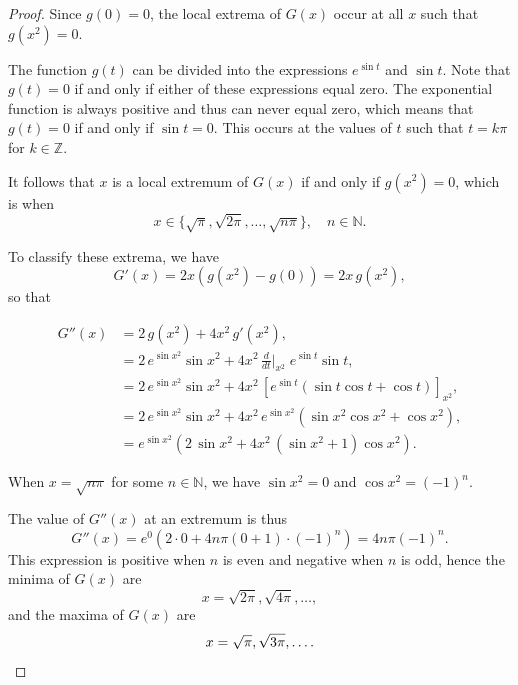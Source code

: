 \begin{enumerate}
\begin{enumerate}
\begin{proof}
                    Since $g(0) = 0$, the local extrema of $G(x)$ occur at all $x$ such that $g(x^2) = 0$.

                    The function $g(t)$ can be divided into the expressions $e^{\sin t}$ and $\sin t$.
                    Note that $g(t) = 0$ if and only if either of these expressions equal zero.
                    The exponential function is always positive and thus can never equal zero, which means that $g(t) = 0$ if and only if $\sin t = 0$.
                    This occurs at the values of $t$ such that $t = k \pi$ for $k \in \mathbb{Z}$.

                    It follows that $x$ is a local extremum of $G(x)$ if and only if $g(x^2) = 0$, which is when
                    \[ x \in \{\sqrt{\pi}, \sqrt{2 \pi}, \ldots, \sqrt{n \pi}\}, \quad n \in \mathbb{N}. \]

                    To classify these extrema, we have
                    \[ G'(x) = 2 x \left(g(x^2) - g(0)\right) = 2 x \, g(x^2), \]
                    so that
                    \begin{spreadlines}{\baselineskip}
                        \begin{align*}
                            G''(x) &= 2 \, g(x^2) + 4 x^2 \, g'(x^2), \\
                            &= 2 \, e^{\sin x^2} \sin x^2 + 4 x^2 \, \frac{d}{d t} \big|_{x^2} \; e^{\sin t} \sin t, \\
                            &= 2 \, e^{\sin x^2} \sin x^2 + 4 x^2 \, \left[e^{\sin t} (\sin t \cos t + \cos t)\right]_{x^2}, \\
                            &= 2 \, e^{\sin x^2} \sin x^2 + 4 x^2 \, e^{\sin x^2} (\sin x^2 \cos x^2 + \cos x^2), \\
                            &= e^{\sin x^2} \left(2 \, \sin x^2 + 4 x^2 \, (\sin x^2 + 1) \cos x^2\right).
                        \end{align*}
                    \end{spreadlines}

                    When $x = \sqrt{n \pi}$ for some $n \in \mathbb{N}$, we have $\sin x^2 = 0$ and $\cos x^2 = (-1)^n$.

                    The value of $G''(x)$ at an extremum is thus
                    \[
                        G''(x) = e^0 \left(2 \cdot 0 + 4 n \pi (0 + 1) \cdot (-1)^n\right) = 4 n \pi (-1)^n.
                    \]
                    This expression is positive when $n$ is even and negative when $n$ is odd, hence the minima of $G(x)$ are
                    \[ x = \sqrt{2 \pi}, \sqrt{4 \pi}, \ldots, \]
                    and the maxima of $G(x)$ are
                    \[ x = \sqrt{\pi}, \sqrt{3 \pi}, \ldots. \qedhere \]
                \end{proof}


\end{enumerate}
\end{enumerate}
